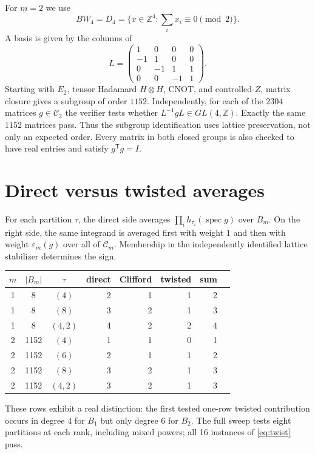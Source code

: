 \documentclass[11pt]{article}
\begin{document}
For $m=2$ we use
\[
 BW_4=D_4=\{x\in\mathbb Z^4:\textstyle\sum_i x_i\equiv0\pmod2\}.
\]
A basis is given by the columns of
\[
L=\begin{pmatrix}
1&0&0&0\\-1&1&0&0\\0&-1&1&1\\0&0&-1&1
\end{pmatrix}.
\]
Starting with $E_2$, tensor Hadamard $H\otimes H$, CNOT, and controlled-$Z$,
matrix closure gives a subgroup of order $1152$.  Independently, for each of
the $2304$ matrices $g\in\mathcal C_2$ the verifier tests whether
$L^{-1}gL\in GL(4,\mathbb Z)$.  Exactly the same $1152$ matrices pass.  Thus
the subgroup identification uses lattice preservation, not only an expected
order.  Every matrix in both closed groups is also checked to have real
entries and satisfy $g^{\mathsf T}g=I$.

\section{Direct versus twisted averages}
For each partition $\tau$, the direct side averages
$\prod_i h_{\tau_i}(\operatorname{spec}g)$ over $B_m$.  On the right side,
the same integrand is averaged first with weight $1$ and then with weight
$\varepsilon_m(g)$ over all of $\mathcal C_m$.  Membership in the independently
identified lattice stabilizer determines the sign.

\begin{center}
\begin{tabular}{@{}cccrrrrr@{}}\toprule
$m$&$|B_m|$&$\tau$&direct&Clifford&twisted&sum\\\midrule
1&8&$(4)$&2&1&1&2\\
1&8&$(8)$&3&2&1&3\\
1&8&$(4,2)$&4&2&2&4\\
2&1152&$(4)$&1&1&0&1\\
2&1152&$(6)$&2&1&1&2\\
2&1152&$(8)$&3&2&1&3\\
2&1152&$(4,2)$&3&2&1&3\\\bottomrule
\end{tabular}
\end{center}
These rows exhibit a real distinction: the first tested one-row twisted
contribution occurs in degree $4$ for $B_1$ but only degree $6$ for $B_2$.
The full sweep tests eight partitions at each rank, including mixed powers;
all 16 instances of \eqref{eq:twist} pass.
\end{document}
